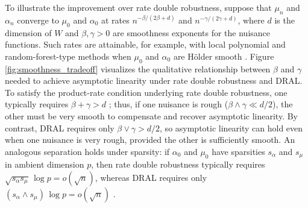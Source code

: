 \documentclass[11pt]{article}
\theoremstyle{plain}
\begin{document}
To illustrate the improvement over rate double robustness, suppose that \(\mu_n\)
and \(\alpha_n\) converge to \(\mu_0\) and \(\alpha_0\) at rates
\(n^{-\beta/(2\beta+d)}\) and \(n^{-\gamma/(2\gamma+d)}\), where \(d\) is the
dimension of \(W\) and \(\beta,\gamma>0\) are smoothness exponents for the nuisance
functions. Such rates are attainable, for example, with local polynomial and
random-forest-type methods when \(\mu_0\) and \(\alpha_0\) are H\"older smooth
\citep{stone1982optimal,wainwright2019high,biau2012analysis,mourtada2020minimax}.
Figure \ref{fig:smoothness_tradeoff} visualizes the qualitative relationship
between \(\beta\) and \(\gamma\) needed to achieve asymptotic linearity under rate
double robustness and DRAL. To satisfy the product-rate condition underlying
rate double robustness, one typically requires \(\beta+\gamma>d\)
\citep{robins2008higher}; thus, if one nuisance is rough
(\(\beta\wedge\gamma \ll d/2\)), the other must be very smooth to compensate and
recover asymptotic linearity. By contrast, DRAL requires only
\(\beta\vee\gamma>d/2\), so asymptotic linearity can hold even when one nuisance
is very rough, provided the other is sufficiently smooth. An analogous
separation holds under sparsity: if \(\alpha_0\) and \(\mu_0\) have sparsities
\(s_\alpha\) and \(s_\mu\) in ambient dimension \(p\), then rate double
robustness typically requires \(\sqrt{s_\alpha s_\mu}\,\log p=o(\sqrt{n})\),
whereas DRAL requires only \((s_\alpha\wedge s_\mu)\,\log p=o(\sqrt{n})\)
\citep{bradic2019minimax,smucler2019unifying,liu2023root}.



\end{document}
